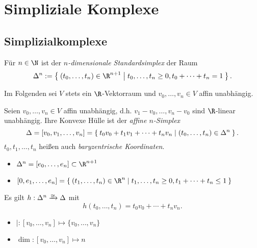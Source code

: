 
\chapter{Simpliziale Komplexe}

\section{Simplizialkomplexe}

\begin{df}
	Für $n \in \N$ ist der \emph{$n$-dimensionale Standardsimplex} der Raum
	\[
		\Delta^n := \Set{ (t_0, \dotsc, t_n) \in \R^{n+1} | t_0, \dotsc, t_n \ge 0, t_0 + \dotsb + t_n = 1 }.
	\]
\end{df}

\begin{conv}
	Im Folgenden sei $V$ stets ein $\R$-Vektorraum und $v_0, \dotsc, v_n \in V$ affin unabhängig.
\end{conv}

\begin{df}
	Seien $v_0, \dotsc, v_n \in V$ affin unabhängig, d.h. $v_1 - v_0, \dotsc, v_n - v_0$ sind $\R$-linear unabhängig.
	Ihre Konvexe Hülle ist der \emph{affine $n$-Simplex}
	\[
		\Delta = [v_0, v_1, \dotsc, v_n]
		= \Set{ t_0v_0 + t_1v_1 + \dotsb + t_nv_n | (t_0, \dotsc, t_n) \in \Delta^n }.
	\]
	$t_0, t_1, \dotsc, t_n$ heißen auch \emph{baryzentrische Koordinaten}.
\end{df}

\begin{ex}
	\begin{itemize}
		\item
			$\Delta^n = [e_0, \dotsc, e_n] \subset \R^{n+1}$
		\item
			$[0,e_1,\dotsc,e_n] = \Set{ (t_1, \dotsc, t_n) \in \R^n | t_1, \dotsc, t_n \ge 0, t_1 + \dotsb + t_n \le 1 }$
	\end{itemize}
\end{ex}

\begin{nt}
	Es gilt $h: \Delta^n \homto \Delta$ mit
	\[
		h(t_0, \dotsc, t_n) = t_0 v_0 + \dotsb + t_n v_n.
	\]
	\begin{itemize}
		\item
			$\vert: [v_0, \dotsc, v_n] \mapsto \{v_0, \dotsc, v_n\}$
		\item
			$\dim: [v_0, \dotsc, v_n] \mapsto n$
	\end{itemize}
\end{nt}

